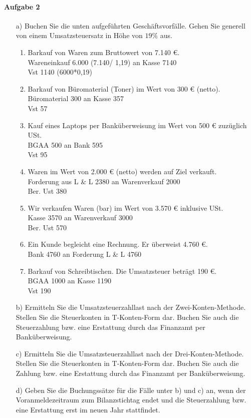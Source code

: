 \documentclass[paper=a4, fontsize=11pt]{scrartcl}
\numberwithin{equation}{section}
\numberwithin{figure}{section}
\numberwithin{table}{section}
\begin{document}
\paragraph{Aufgabe 2}
\begin{itemize}
\item[a)] Buchen Sie die unten aufgeführten Geschäftsvorfälle. Gehen Sie generell von einem Umsatzsteuersatz in Höhe von $19 \%$ aus. \\
  \begin{enumerate}
  \item Barkauf von Waren zum Bruttowert von 7.140 €.   \\
  Wareneinkauf 6.000 (7.140/ 1,19) an Kasse 7140 \\
  Vst 1140 (6000*0,19)
  \item Barkauf von Büromaterial (Toner) im Wert von 300 € (netto). \\
  Büromaterial 300 an Kasse 357 \\
  Vst 57  
  \item Kauf eines Laptops per Banküberweisung im Wert von 500 € zuzüglich USt. \\
  BGAA 500 an Bank 595 \\
  Vst 95  
  \item Waren im Wert von 2.000 € (netto) werden auf Ziel verkauft. \\
  Forderung aus L \& L 2380 an Warenverkauf 2000 \\
  Ber. Ust 380  
  \item Wir verkaufen Waren (bar) im Wert von 3.570 € inklusive USt. \\
  Kasse 3570 an Warenverkauf 3000 \\
  Ber. Ust 570
  \item Ein Kunde begleicht eine Rechnung. Er überweist 4.760 €. \\
  Bank 4760 an Forderung L \& L 4760  
  \item Barkauf von Schreibtischen. Die Umsatzsteuer beträgt 190 €. \\
  BGAA 1000 an Kasse 1190 \\
  Vst 190 
  \end{enumerate}
\item[b)] Ermitteln Sie die Umsatzsteuerzahllast nach der Zwei-Konten-Methode. Stellen Sie die Steuerkonten in T-Konten-Form dar. Buchen Sie auch die Steuerzahlung bzw. eine Erstattung durch das Finanzamt per Banküberweisung. 
\item[c)] Ermitteln Sie die Umsatzsteuerzahllast nach der Drei-Konten-Methode. Stellen Sie die Steuerkonten in T-Konten-Form dar. Buchen Sie auch die Zahlung bzw. eine Erstattung durch das Finanzamt per Banküberweisung. 
\item[d)] Geben Sie die Buchungssätze für die Fälle unter b) und c) an, wenn der Voranmeldezeitraum zum Bilanzstichtag endet und die Steuerzahlung bzw. eine Erstattung erst im neuen Jahr stattfindet. 
\end{itemize}
\end{document}
